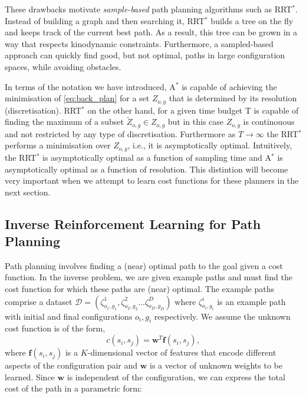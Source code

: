 \documentclass{article}  %
\begin{document}
These drawbacks motivate \emph{sample-based} path planning algorithms such as RRT$^*$. Instead of building a graph and then searching it, RRT$^*$ builds a tree on the fly and keeps track of the current best path. As a result, this tree can be grown in a way that respects kinodynamic constraints. Furthermore, a sampled-based approach can quickly find good, but not optimal, paths in large configuration spaces, while avoiding obstacles.



In terms of the notation we have introduced, A$^*$ is capable of achieving the minimisation of \eqref{eq:back_plan} for a set $Z_{o,g}$ that is determined by its resolution (discretisation). RRT$^*$ on the other hand, for a given time budget T is capable of finding the maximum of a subset $\tilde{Z}_{o,g} \in  Z_{o,g}$ but in this case $Z_{o,g}$ is continouous and not restricted by any type of discretisation. Furthermore as $T \rightarrow \infty$ the RRT$^*$ performs a minimisation over $Z_{o,g}$, i.e., it is asymptotically optimal. Intuitively, the RRT$^*$ is asymptotically optimal as a function of sampling time and A$^*$ is asymptotically optimal as a function of resolution. This distintion will become very important when we attempt to learn cost functions for these planners in the next section.

\subsection{Inverse Reinforcement Learning for Path Planning \label{subsec:inverse_problem}}
Path planning involves finding a (near) optimal path to the goal given a cost function. In the inverse problem, we are given example paths and must find the cost function for which these paths are (near) optimal.  The example paths comprise a dataset $\mathcal{D} = (\zeta^1_{o_1,g_1},\zeta^2_{o_2,g_2}...\zeta^D_{o_D,g_D})$ where $\zeta^i_{o_i,g_i}$ is an example path with initial and final configurations $o_i,g_i$ respectively. We assume the unknown cost function is of the form,
\begin{equation}
	c(s_i,s_j) = \mathbf{w}^T \mathbf{f}(s_i,s_j), \label{eq:inner_prod}
\end{equation}
where $\mathbf{f}(s_i,s_j)$ is a $K$-dimensional vector of features that encode different aspects of the configuration pair and $\mathbf{w}$ is a vector of unknown weights to be learned. Since $\mathbf{w}$ is independent of the configuration, we can express the total cost of the path in a parametric form:
\end{document}
